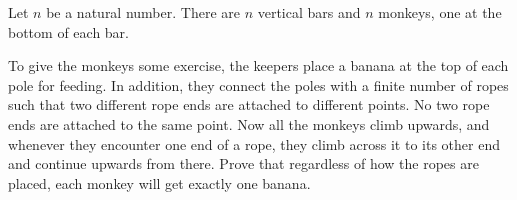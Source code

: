 Let $n$ be a natural number. There are $n$ vertical bars and $n$ monkeys, one at the bottom of each bar.

To give the monkeys some exercise, the keepers place a banana at the top of each pole for feeding.
In addition, they connect the poles with a finite number of ropes such that two different rope ends
are attached to different points. No two rope ends are attached to the same point.
Now all the monkeys climb upwards, and whenever they encounter one end of a rope,
they climb across it to its other end and continue upwards from there.
Prove that regardless of how the ropes are placed, each monkey will get exactly one banana.